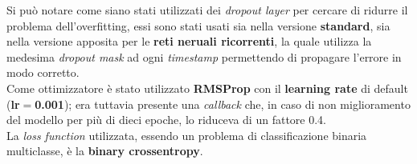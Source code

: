 Si può notare come siano stati utilizzati dei \textit{dropout layer} per cercare di ridurre il problema dell'overfitting, essi sono stati usati sia nella versione \textbf{standard}, sia nella versione apposita per le \textbf{reti neruali ricorrenti}, la quale utilizza la medesima \textit{dropout mask} ad ogni \textit{timestamp} permettendo di propagare l'errore in modo corretto. \cite{DeepLearningPython}
\\Come ottimizzatore è stato utilizzato \textbf{RMSProp} con il \textbf{learning rate} di default (\textbf{lr$=$0.001}); era tuttavia presente una \textit{callback} che, in caso di non miglioramento del modello per più di dieci epoche, lo riduceva di un fattore 0.4.
\\La \textit{loss function} utilizzata, essendo un problema di classificazione binaria multiclasse, è la \textbf{binary crossentropy}.